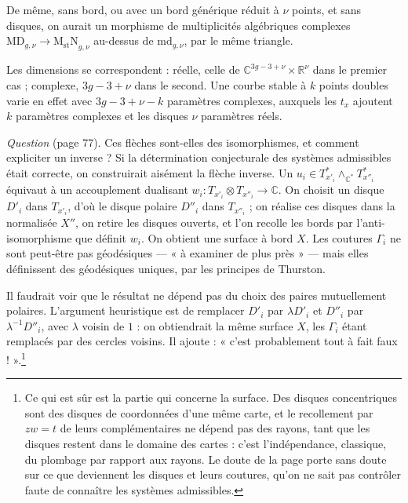 \documentclass[11pt,a4paper]{article}
\begin{document}

De même, sans bord, ou avec un bord générique réduit à $\nu$ points, et sans
disques, on aurait un morphisme de multiplicités algébriques complexes
$\mathrm{MD}_{g,\nu} \to \mathrm{M_{st}N}_{g,\nu}$ au-dessus de
$\mathrm{md}_{g,\nu}$, par le même triangle.

Les dimensions se correspondent : réelle, celle de
$\mathbb{C}^{3g-3+\nu} \times \mathbb{R}^{\nu}$ dans le premier cas ;
complexe, $3g - 3 + \nu$ dans le second. Une courbe stable à $k$ points
doubles varie en effet avec $3g - 3 + \nu - k$ paramètres complexes, auxquels
les $t_x$ ajoutent $k$ paramètres complexes et les disques $\nu$ paramètres
réels.

\emph{Question} (page 77). Ces flèches sont-elles des isomorphismes, et
comment expliciter un inverse ? Si la détermination conjecturale des systèmes
admissibles était correcte, on construirait aisément la flèche inverse. Un
$u_i \in T^{*}_{x'_i} \wedge_{\mathbb{C}^{*}} T^{*}_{x''_i}$ équivaut à un
accouplement dualisant $w_i : T_{x'_i} \otimes T_{x''_i} \to \mathbb{C}$. On
choisit un disque $D'_i$ dans $T_{x'_i}$, d'où le disque polaire $D''_i$ dans
$T_{x''_i}$ ; on réalise ces disques dans la normalisée $X''$, on retire les
disques ouverts, et l'on recolle les bords par l'anti-isomorphisme que définit
$w_i$. On obtient une surface à bord $X$. Les coutures $\Gamma_i$ ne sont peut-être
pas géodésiques --- « à examiner de plus près » --- mais elles définissent des
géodésiques uniques, par les principes de Thurston.

Il faudrait voir que le résultat ne dépend pas du choix des paires
mutuellement polaires. L'argument heuristique est de remplacer $D'_i$ par
$\lambda D'_i$ et $D''_i$ par $\lambda^{-1} D''_i$, avec $\lambda$ voisin de
$1$ : on obtiendrait la même surface $X$, les $\Gamma_i$ étant remplacés par
des cercles voisins. Il ajoute : « c'est probablement tout à fait faux
! ».\footnote{Ce qui est sûr est la partie qui concerne la surface. Des
disques concentriques sont des disques de coordonnées d'une même carte, et le
recollement par $zw = t$ de leurs complémentaires ne dépend pas des rayons,
tant que les disques restent dans le domaine des cartes : c'est
l'indépendance, classique, du plombage par rapport aux rayons. Le doute de la
page porte sans doute sur ce que deviennent les disques et leurs coutures,
qu'on ne sait pas contrôler faute de connaître les systèmes admissibles.}
\end{document}
